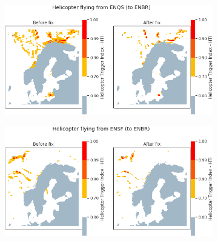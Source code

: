 \begin{figure}[H]
    \begin{subfigure}{0.45\textwidth}
    \centering
    \includegraphics[width=\textwidth]{Figures/Analysis02.png}
    \caption{}
    \label{fig:HTIA02}
    \end{subfigure}
\hfill
    \begin{subfigure}{0.45\textwidth}
    \centering
    \includegraphics[width=\textwidth]{Figures/Analysis03.png}
    \caption{}
    \label{fig:HTIA03}
    \end{subfigure}


\end{figure}
